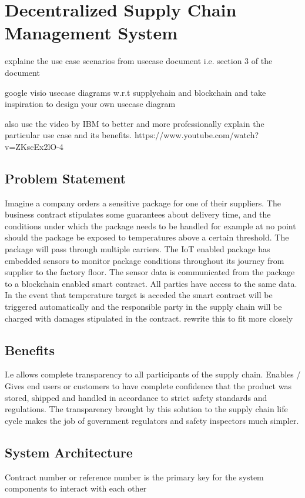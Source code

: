 \section{Decentralized Supply Chain Management System}\label{usecase}
explaine the use case scenarios from usecase document i.e. section 3 of the document

google visio usecase diagrams w.r.t supplychain and blockchain and take inspiration to design your own usecase diagram

also use the video by IBM to better and more professionally explain the particular use case and its benefits.
https://www.youtube.com/watch?v=ZKscEx2lO-4



\subsection{Problem Statement}
Imagine a company orders a sensitive package for one of their suppliers. The business contract stipulates some guarantees about delivery time, and the conditions under which the package needs to be handled for example at no point should the package be exposed to temperatures above a certain threshold. The package will pass through multiple carriers. The IoT enabled package has embedded sensors to monitor package conditions throughout its journey from supplier to the factory floor. The sensor data is communicated from the package to a blockchain enabled smart contract. All parties have access to the same data. In the event that temperature target is acceded the smart contract will be triggered automatically and the responsible party in the supply chain will be charged with damages stipulated in the contract.
rewrite this to fit more closely 

\subsection{Benefits}
I.e allows complete transparency to all participants of the supply chain. Enables / Gives end users or customers to have complete confidence that the product was stored, shipped and handled in accordance to strict safety standards and regulations. The transparency brought by this solution to  the supply chain life cycle makes the job of government regulators and safety inspectors much simpler. 

\subsection{System Architecture}
Contract number or reference number is the primary key for the system components to interact with each other
